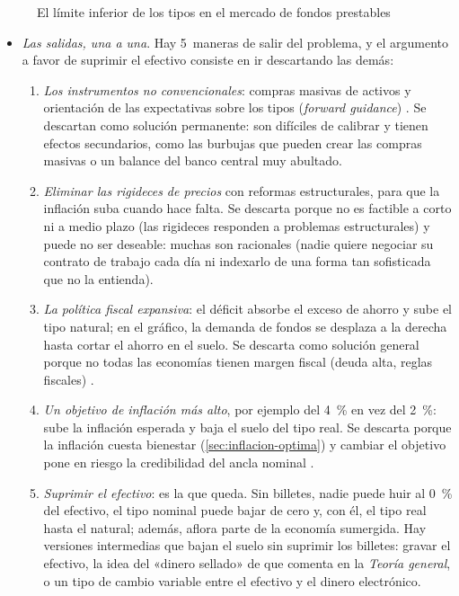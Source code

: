 \documentclass[11pt]{article}
\begin{document}
\begin{figure}[H]
\centering
\caption{El límite inferior de los tipos en el mercado de fondos prestables}\label{fig:fondos-elb}
\end{figure}

\begin{itemize}
\item \emph{Las salidas, una a una}. Hay 5~maneras de salir del problema, y el argumento a favor de suprimir el efectivo consiste en ir descartando las demás\nocite{FernandezVillaverde2016Eliminemos}:
  \begin{enumerate}
  \item \emph{Los instrumentos no convencionales}: compras masivas de activos y orientación de las expectativas sobre los tipos (\emph{forward guidance}) . Se descartan como solución permanente: son difíciles de calibrar y tienen efectos secundarios, como las burbujas que pueden crear las compras masivas o un balance del banco central muy abultado.
  \item \emph{Eliminar las rigideces de precios} con reformas estructurales, para que la inflación suba cuando hace falta. Se descarta porque no es factible a corto ni a medio plazo (las rigideces responden a problemas estructurales) y puede no ser deseable: muchas son racionales (nadie quiere negociar su contrato de trabajo cada día ni indexarlo de una forma tan sofisticada que no la entienda).
  \item \emph{La política fiscal expansiva}: el déficit absorbe el exceso de ahorro y sube el tipo natural; en el gráfico, la demanda de fondos se desplaza a la derecha hasta cortar el ahorro en el suelo. Se descarta como solución general porque no todas las economías tienen margen fiscal (deuda alta, reglas fiscales) .
  \item \emph{Un objetivo de inflación más alto}, por ejemplo del 4~\% en vez del 2~\%\nocite{BlanchardDellAricciaMauro2010Rethinking}: sube la inflación esperada y baja el suelo del tipo real. Se descarta porque la inflación cuesta bienestar (\ref{sec:inflacion-optima}) y cambiar el objetivo pone en riesgo la credibilidad del ancla nominal .
  \item \emph{Suprimir el efectivo}: es la que queda. Sin billetes, nadie puede huir al 0~\% del efectivo, el tipo nominal puede bajar de cero y, con él, el tipo real hasta el natural; además, aflora parte de la economía sumergida. Hay versiones intermedias que bajan el suelo sin suprimir los billetes: gravar el efectivo, la idea del «dinero sellado» de  que  comenta en la \emph{Teoría general}\nocite{Keynes1936}, o un tipo de cambio variable entre el efectivo y el dinero electrónico\nocite{AgarwalKimball2015Breaking}.
  \end{enumerate}
\end{itemize}
\end{document}
